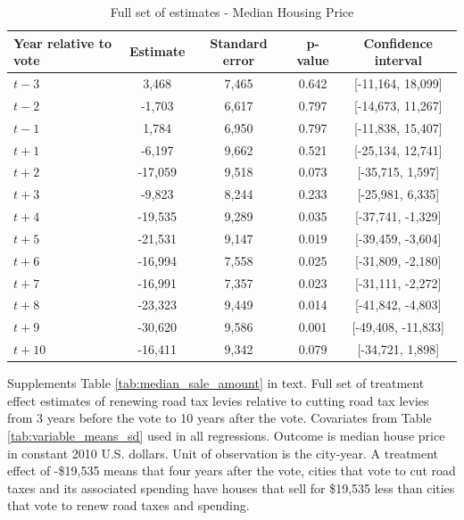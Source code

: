 \begin{table}[htbp]
    \centering
    \caption{Full set of estimates - Median Housing Price}
    \label{tab:median_sale_amount_full}
    \begin{tabular}{p{3cm}cccc}
        \hline
        \textbf{Year relative to vote} & \textbf{Estimate} & \textbf{Standard error} & \textbf{p-value} & \textbf{Confidence interval} \\
        \hline
        $t - 3$  & 3,468   & 7,465  & 0.642  & [-11,164, 18,099] \\
        $t - 2$  & -1,703  & 6,617  & 0.797  & [-14,673, 11,267] \\
        $t - 1$  & 1,784   & 6,950  & 0.797  & [-11,838, 15,407] \\
        $t + 1$ & -6,197  & 9,662  & 0.521  & [-25,134, 12,741] \\
        $t + 2$ & -17,059 & 9,518  & 0.073  & [-35,715, 1,597] \\
        $t + 3$ & -9,823  & 8,244  & 0.233  & [-25,981, 6,335] \\
        $t + 4$ & -19,535 & 9,289  & 0.035  & [-37,741, -1,329] \\
        $t + 5$ & -21,531 & 9,147  & 0.019  & [-39,459, -3,604] \\
        $t + 6$ & -16,994 & 7,558  & 0.025  & [-31,809, -2,180] \\
        $t + 7$ & -16,991 & 7,357  & 0.023  & [-31,111, -2,272] \\
        $t + 8$ & -23,323 & 9,449  & 0.014  & [-41,842, -4,803] \\
        $t + 9$ & -30,620 & 9,586  & 0.001  & [-49,408, -11,833] \\
        $t + 10$ & -16,411 & 9,342  & 0.079  & [-34,721, 1,898] \\
        \hline
    \end{tabular}
    \begin{tablenotes}
        \small
        \item Supplements Table \ref{tab:median_sale_amount} in text. Full set of treatment effect estimates of renewing road tax levies relative to cutting road tax levies from 3 years before the vote to 10 years after the vote. Covariates from Table \ref{tab:variable_means_sd} used in all regressions. Outcome is median house price in constant 2010 U.S. dollars. Unit of observation is the city-year. A treatment effect of -\$19,535 means that four years after the vote, cities that vote to cut road taxes and its associated spending have houses that sell for \$19,535 less than cities that vote to renew road taxes and spending.
    \end{tablenotes}
\end{table}

